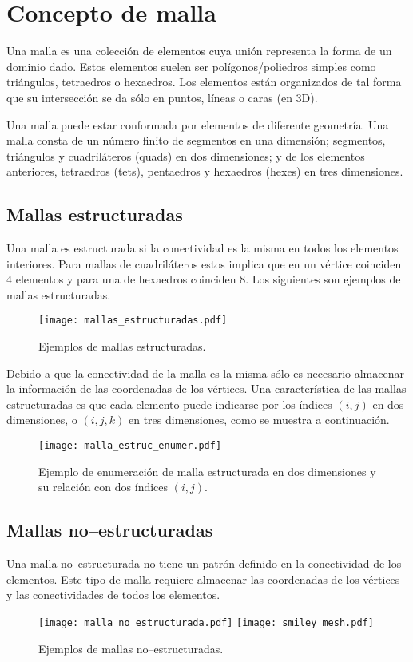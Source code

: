 \section{Concepto de malla}
Una malla es una colección de elementos cuya unión representa la forma de un dominio dado. Estos elementos suelen ser polígonos/poliedros simples como triángulos, tetraedros o hexaedros. Los elementos están organizados de tal forma que su intersección se da sólo en puntos, líneas o caras (en 3D).

Una malla puede estar conformada por elementos de diferente geometría. Una malla consta de un número finito de segmentos en una dimensión; segmentos, triángulos y cuadriláteros (quads) en dos dimensiones; y de los elementos anteriores, tetraedros (tets), pentaedros y hexaedros (hexes) en tres dimensiones.

\subsection{Mallas estructuradas}
Una malla es estructurada si la conectividad es la misma en todos los elementos interiores. Para mallas de cuadriláteros estos implica que en un vértice coinciden 4 elementos y para una de hexaedros coinciden 8. Los siguientes son ejemplos de mallas estructuradas.
\begin{figure}[H]
    \centering
    \texttt{[image: mallas\_estructuradas.pdf]}
    \caption{Ejemplos de mallas estructuradas.}
\end{figure}


Debido a que la conectividad de la malla es la misma sólo es necesario almacenar la información de las coordenadas de los vértices. Una característica de las mallas estructuradas es que cada elemento puede indicarse por los índices $(i, j)$ en dos dimensiones, o $(i, j, k)$ en tres dimensiones, como se muestra a continuación.
\begin{figure}[H]
    \centering
    \texttt{[image: malla\_estruc\_enumer.pdf]}
    \caption{Ejemplo de enumeración de malla estructurada en dos dimensiones y su relación con dos índices $(i, j)$.}
\end{figure}


\subsection{Mallas no--estructuradas}
Una malla no--estructurada no tiene un patrón definido en la conectividad de los elementos. Este tipo de malla requiere almacenar las coordenadas de los vértices y las conectividades de todos los elementos.
\begin{figure}[H]
    \centering
    \texttt{[image: malla\_no\_estructurada.pdf]}
    \texttt{[image: smiley\_mesh.pdf]}
    \caption{Ejemplos de mallas no--estructuradas.}
\end{figure}

